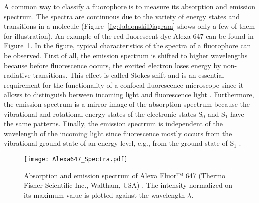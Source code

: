 A common way to classify a fluorophore is to measure its absorption and emission spectrum. The spectra are continuous due to the variety of energy states and transitions in a molecule (Figure~\ref{fig:JablonskiDiagram} shows only a few of them for illustration). An example of the red fluorescent dye Alexa 647 can be found in Figure~\ref{fig:Alexa647_Spectra}. In the figure, typical characteristics of the spectra of a fluorophore can be observed. First of all, the emission spectrum is shifted to higher wavelengths because before fluorescence occurs, the excited electron loses energy by non-radiative transitions. This effect is called Stokes shift and is an essential requirement for the functionality of a confocal fluorescence microscope since it allows to distinguish between incoming light and fluorescence light \cite{Lichtman2005}. Furthermore, the emission spectrum is a mirror image of the absorption spectrum because the vibrational and rotational energy states of the electronic states S$_0$ and S$_1$ have the same patterns. Finally, the emission spectrum is independent of the wavelength of the incoming light since fluorescence mostly occurs from the vibrational ground state of an energy level, e.g., from the ground state of S$_1$ \cite{Lakowicz2006}.

\begin{figure}[h!]
	\centering
	\texttt{[image: Alexa647\_Spectra.pdf]}
	\caption[Absorption and emission spectrum of Alexa 647]{Absorption and emission spectrum of Alexa Fluor™ 647 (Thermo Fisher Scientific Inc., Waltham, USA) \cite{Alexa647_Spectra}. The intensity normalized on its maximum value is plotted against the wavelength $\lambda$.}
	\label{fig:Alexa647_Spectra}
\end{figure}